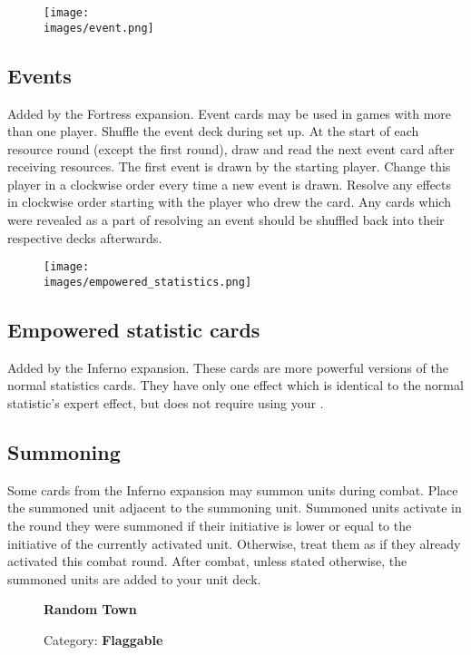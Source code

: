 \begin{wrapfigure}{r}{0.5\textwidth}
  \begin{center}
  \texttt{[image: \\images/event.png]}
  \end{center}
\end{wrapfigure}
\subsection*{Events}
Added by the Fortress expansion.
Event cards may be used in games with more than one player.
Shuffle the event deck during set up.
At the start of each resource round (except the first round), draw and read the next event card after receiving resources.
The first event is drawn by the starting player.
Change this player in a clockwise order every time a new event is drawn.
Resolve any effects in clockwise order starting with the player who drew the card.
Any cards which were revealed as a part of resolving an event should be shuffled back into their respective decks afterwards.

\begin{wrapfigure}{r}{0.5\textwidth}
  \begin{center}
  \texttt{[image: \\images/empowered\_statistics.png]}
  \end{center}
\end{wrapfigure}
\subsection*{Empowered statistic cards}
Added by the Inferno expansion.
These cards are more powerful versions of the normal statistics cards.
They have only one effect which is identical to the normal statistic's expert effect, but does not require using your .

\subsection*{Summoning}
Some cards from the Inferno expansion may summon units during combat.
Place the summoned unit adjacent to the summoning unit.
Summoned units activate in the round they were summoned if their initiative is lower or equal to the initiative of the currently activated unit.
Otherwise, treat them as if they already activated this combat round.
After combat, unless stated otherwise, the summoned units are added to your unit deck.

\begin{wrapfigure}{r}{0.5\textwidth}
  \begin{center}
    \textbf{Random Town}
    \caption{\scriptsize Category: \scriptsize\textbf{Flaggable}}
  \end{center}
\end{wrapfigure}
